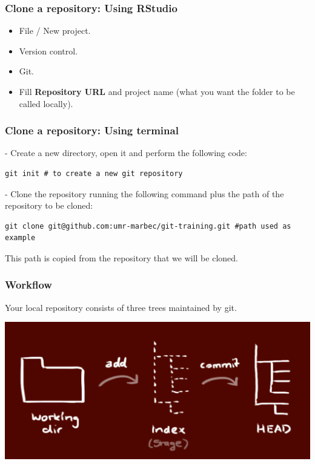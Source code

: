 \documentclass{beamer}
\begin{document}
\begin{frame}[fragile]
\frametitle{Clone a repository: Using RStudio}
\begin{itemize}
    \item File / New project. 
    \item Version control.
    \item Git.
    \item Fill \textbf{Repository URL} and project name (what you want the folder to be called locally).
\end{itemize}
\end{frame}

\begin{frame}[fragile]
\frametitle{Clone a repository: Using terminal}

- Create a new directory, open it and perform the following code:

\begin{lstlisting}
git init # to create a new git repository
\end{lstlisting}

- Clone the repository running the following command plus the path of the repository to be cloned:

\begin{lstlisting}
git clone git@github.com:umr-marbec/git-training.git #path used as example
\end{lstlisting}

This path is copied from the repository that we will be cloned.
\end{frame}


\begin{frame}[fragile]
\frametitle{Workflow}

Your local repository consists of three trees maintained by git.

\vspace{1em}
\begin{center}
\includegraphics[scale=0.25]{img/workflow.png}
\end{center}
\end{frame}
\end{document}
